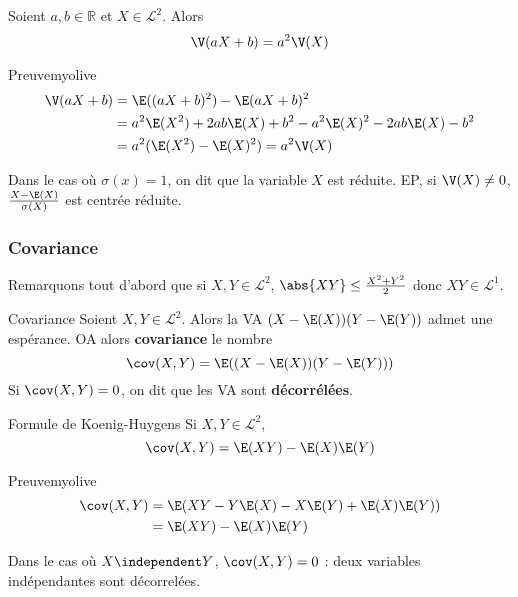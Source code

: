     \begin{prop}{}{}
        Soient $a,b \in \mathbb{R}$ et $X \in \mathcal{L}^2$. Alors 
        \[ \V(aX + b) = a^2 \V(X) \]   
    \end{prop}

    \begin{demo}{Preuve}{myolive}
        \begin{align*}
            \V(aX + b) 
            &= \E((aX + b)^2) - \E(aX + b)^2 \\
            &= a^2 \E(X^2) + 2 a b \E(X) + b^2 - a^2 \E(X)^2 - 2 a b \E(X) - b^2 \\
            &= a^2 (\E(X^2) - \E(X)^2) = a^2 \V(X)
        \end{align*}
    \end{demo}

    Dans le cas où $\sigma(x) = 1$, on dit que la variable $X$ est réduite. EP, si $\V(X) \neq 0$, $\frac{X -\E(X)}{\sigma(X)}$ est centrée réduite.

    \subsubsection{Covariance}

    Remarquons tout d’abord que si $X,Y \in \mathcal{L}^2$, $\abs{XY} \leq \frac{X^2 + Y^2}{2}$ donc $XY \in \mathcal{L}^1$. 

    \begin{defitheo}{Covariance}{}
        Soient $X,Y \in \mathcal{L}^2$. Alors la VA $(X-\E(X))(Y - \E(Y))$ admet une espérance. OA alors \textbf{covariance} le nombre 
        \[ \cov(X,Y) = \E((X- \E(X))(Y - \E(Y))) \]   
        Si $\cov(X,Y) = 0$, on dit que les VA sont \textbf{décorrélées}.
    \end{defitheo}

    \begin{prop}{Formule de Koenig-Huygens}{}
        Si $X,Y \in \mathcal{L}^2$, 
        \[ \cov(X,Y) = \E(XY) - \E(X)\E(Y) \] 
    \end{prop}

    \begin{demo}{Preuve}{myolive}
        \begin{align*}
            \cov(X,Y) 
            &= \E(XY - Y\E(X) - X\E(Y) + \E(X) \E(Y)) \\
            &= \E(XY) - \E(X)\E(Y) 
        \end{align*}
    \end{demo}

    Dans le cas où $X \independent Y$, $\cov(X,Y) = 0$ : deux variables indépendantes sont décorrelées.

